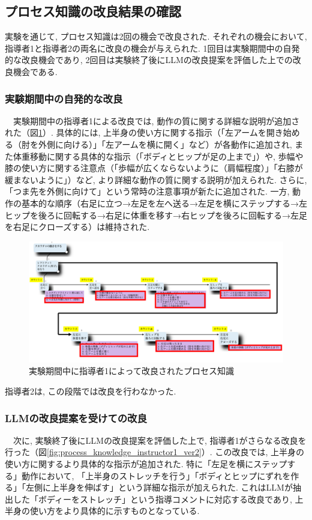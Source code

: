 \subsection{プロセス知識の改良結果の確認}
実験を通じて, プロセス知識は2回の機会で改良された. それぞれの機会において, 指導者1と指導者2の両名に改良の機会が与えられた. 1回目は実験期間中の自発的な改良機会であり, 2回目は実験終了後にLLMの改良提案を評価した上での改良機会である. \\

\subsubsection{実験期間中の自発的な改良}
　実験期間中の指導者1による改良では, 動作の質に関する詳細な説明が追加された（図\ref{fig:process_knowledge_instructor1_ver1}）. 具体的には, 上半身の使い方に関する指示（「左アームを開き始める（肘を外側に向ける）」「左アームを横に開く」など）が各動作に追加され, また体重移動に関する具体的な指示（「ボディとヒップが足の上まで」）や, 歩幅や膝の使い方に関する注意点（「歩幅が広くならないように（肩幅程度）」「右膝が緩まないように」）など, より詳細な動作の質に関する説明が加えられた. さらに, 「つま先を外側に向けて」という常時の注意事項が新たに追加された. 一方, 動作の基本的な順序（右足に立つ→左足を左へ送る→左足を横にステップする→左ヒップを後ろに回転する→右足に体重を移す→右ヒップを後ろに回転する→左足を右足にクローズする）は維持された. 

\begin{figure}[htbp]
    \centering
    \includegraphics[width=1.0\linewidth]{./image/process_knowledge_instructor1_ver1.png}
    \caption{実験期間中に指導者1によって改良されたプロセス知識}
    \label{fig:process_knowledge_instructor1_ver1}
\end{figure}

指導者2は, この段階では改良を行わなかった. 

\subsubsection{LLMの改良提案を受けての改良}
　次に, 実験終了後にLLMの改良提案を評価した上で, 指導者1がさらなる改良を行った（図\ref{fig:process_knowledge_instructor1_ver2}）. この改良では, 上半身の使い方に関するより具体的な指示が追加された. 特に「左足を横にステップする」動作において, 「上半身のストレッチを行う」「ボディとヒップにずれを作る」「左側に上半身を伸ばす」という詳細な指示が加えられた. これはLLMが抽出した「ボディーをストレッチ」という指導コメントに対応する改良であり, 上半身の使い方をより具体的に示すものとなっている. \\

